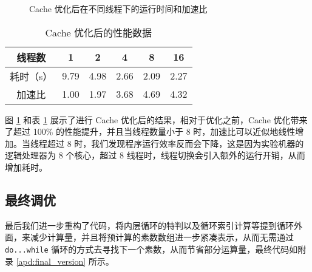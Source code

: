 \documentclass[11pt]{article}
\begin{document}
  \begin{figure}[h]
    \centering
    \caption{Cache 优化后在不同线程下的运行时间和加速比}
    \label{fig:cache}
  \end{figure}
  \begin{table}[h]
    \centering
    \caption{Cache 优化后的性能数据}
    \label{tab:cache}
    \begin{tabular}[b]{cccccc}
      \hline
      线程数 & 1 & 2 & 4 & 8 & 16 \\
      \hline
      耗时（s） & 9.79 & 4.98 & 2.66 & 2.09 & 2.27 \\
      \hline
      加速比 & 1.00 & 1.97 & 3.68 & 4.69 & 4.32 \\
      \hline
    \end{tabular}
  \end{table}

  图 \ref{fig:cache} 和表 \ref{tab:cache} 展示了进行 Cache 优化后的结果，相对于优化之前，Cache 优化带来了超过 100\% 的性能提升，并且当线程数量小于 8 时，加速比可以近似地线性增加。当线程超过 8 时，我们发现程序运行效率反而会下降，这是因为实验机器的逻辑处理器为 8 个核心，超过 8 线程时，线程切换会引入额外的运行开销，从而增加耗时。

  \subsection{最终调优}
  最后我们进一步重构了代码，将内层循环的特判以及循环索引计算等提到循环外面，来减少计算量，并且将预计算的素数数组进一步紧凑表示，从而无需通过 \verb|do...while| 循环的方式去寻找下一个素数，从而节省部分运算量，最终代码如附录 \ref{apd:final_version} 所示。
\end{document}
